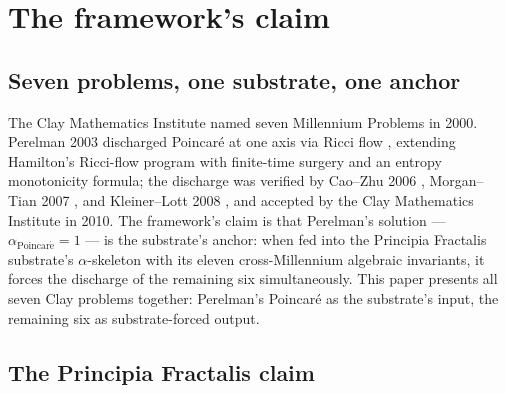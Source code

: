 \documentclass[11pt,a4paper]{article}
\theoremstyle{plain}
\theoremstyle{definition}
\begin{document}
\tableofcontents

\section{The framework's claim}
\label{sec:claim}

\subsection{Seven problems, one substrate, one anchor}
\label{sec:seven-one}

The Clay Mathematics Institute named seven Millennium Problems in
2000. Perelman 2003 discharged Poincar\'e at one axis via Ricci
flow \cite{perelman2002,perelman2003a,perelman2003b}, extending
Hamilton's Ricci-flow program \cite{hamilton1982} with finite-time
surgery and an entropy monotonicity formula; the discharge was
verified by Cao--Zhu 2006 \cite{caozhu2006}, Morgan--Tian 2007
\cite{morgantian2007}, and Kleiner--Lott 2008 \cite{kleinerlott2008},
and accepted by the Clay Mathematics Institute in 2010. The
framework's claim is that Perelman's solution ---
$\alpha_{\mathrm{Poincar\acute e}} = 1$ --- is the substrate's
anchor: when fed into the Principia Fractalis substrate's
$\alpha$-skeleton with its eleven cross-Millennium algebraic
invariants, it forces the discharge of the remaining six
simultaneously. This paper presents all seven Clay problems
together: Perelman's Poincar\'e as the substrate's input, the
remaining six as substrate-forced output.

\subsection{The Principia Fractalis claim}
\label{sec:pf-claim}

\noindent{}
\end{document}
